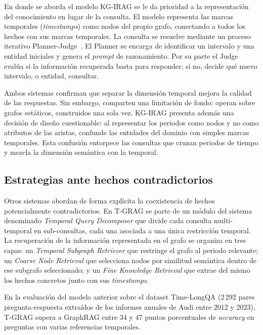 En \cite{kg_irag2025} donde se aborda el modelo KG-IRAG se le da prioridad a la representación del conocimiento en lugar de la consulta. El modelo representa las marcas temporales (\emph{timestamps}) como nodos del propio grafo, conectando a todos los hechos con sus marcas temporales. La consulta se resuelve mediante un proceso iterativo Planner-Judge~\cite{kg_irag2025}. El Planner se encarga de identificar un intervalo y una entidad iniciales y genera el \emph{prompt} de razonamiento. Por su parte el Judge evalúa si la información recuperada basta para responder; si no, decide qué nuevo intervalo, o entidad, consultar.

Ambos sistemas confirman que separar la dimensión temporal mejora la calidad de las respuestas. Sin embargo, comparten una limitación de fondo: operan sobre grafos estáticos, construidos una sola vez. KG-IRAG presenta además una decisión de diseño cuestionable: al representar los periodos como nodos y no como atributos de las aristas, confunde las entidades del dominio con simples marcas temporales. Esta confusión entorpece las consultas que cruzan periodos de tiempo y mezcla la dimensión semántica con la temporal.

\subsection{Estrategias ante hechos contradictorios}

Otros sistemas abordan de forma explícita la coexistencia de hechos potencialmente contradictorios. En T-GRAG \cite{tgrag2025} se parte de un módulo del sistema denominado \emph{Temporal Query Decomposer} que divide cada consulta multi-temporal en sub-consultas, cada una asociada a una única restricción temporal. La recuperación de la información representada en el grafo se organiza en tres capas: un \emph{Temporal Subgraph Retriever} que restringe el grafo al periodo relevante; un \emph{Coarse Node Retrieval} que selecciona nodos por similitud semántica dentro de ese subgrafo seleccionado; y un \emph{Fine Knowledge Retrieval} que extrae del mismo los hechos concretos junto con sus \emph{timestamps}.


En la evaluación del modelo anterior sobre el dataset Time-LongQA (2\,292 pares pregunta-respuesta extraídos de los informes anuales de Audi entre 2012 y 2023), T-GRAG supera a GraphRAG entre 34 y 47 puntos porcentuales de \emph{accuracy} en preguntas con varias referencias temporales.

